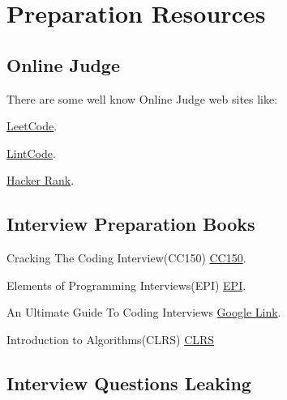 \chapter{Preparation Resources}




\section{Online Judge }

There are some well know Online Judge web sites like:


\href{http://leetcode.com/problemset/}{LeetCode}.

\href{http://www.lintcode.com/en/problem/}{LintCode}.

\href{http://www.hackerrank.com/}{Hacker Rank}.

\section{Interview Preparation Books }

Cracking The Coding Interview(CC150)
\href{http://www.amazon.com/Cracking-Coding-Interview-Programming-Questions/dp/098478280X}{CC150}.

Elements of Programming Interviews(EPI)
\href{http://www.amazon.com/Elements-Programming-Interviews-Insiders-Guide/dp/1479274836}{EPI}.

An Ultimate Guide To Coding Interviews
\href{https://play.google.com/store/books/details?id=XDoVCAAAQBAJ&rdid=book-XDoVCAAAQBAJ&rdot=1&source=gbs_vpt_read&pcampaignid=books_booksearch_viewport}{Google Link}.

Introduction to Algorithms(CLRS)
\href{http://mitpress.mit.edu/books/introduction-algorithms}{CLRS}



\section{Interview Questions Leaking }

